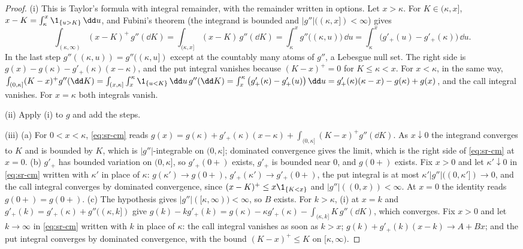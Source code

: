 \begin{proof}
(i) This is Taylor's formula with integral remainder, with the remainder written in options. Let
$x>\kappa$. For $K\in(\kappa,x]$, $x-K=\int_\kappa^x\1_{\{u>K\}}\,\dd u$, and Fubini's theorem (the
integrand is bounded and $|g''|((\kappa,x])<\infty$) gives
\[
  \int_{(\kappa,\infty)}(x-K)^+\,g''(\dd K)=\int_{(\kappa,x]}(x-K)\,g''(\dd K)
  =\int_\kappa^xg''\big((\kappa,u)\big)\,\dd u=\int_\kappa^x\big(g'_+(u)-g'_+(\kappa)\big)\,\dd u .
\]
In the last step $g''((\kappa,u))=g''((\kappa,u])$ except at the countably many atoms of $g''$, a Lebesgue
null set. The right side is $g(x)-g(\kappa)-g'_+(\kappa)(x-\kappa)$, and the put integral vanishes
because $(K-x)^+=0$ for $K\le\kappa<x$. For $x<\kappa$, in the same way,
$\int_{(0,\kappa]}(K-x)^+g''(\dd K)=\int_{(x,\kappa]}\int_x^\kappa\1_{\{u<K\}}\,\dd u\,g''(\dd K)
=\int_x^\kappa\big(g'_+(\kappa)-g'_+(u)\big)\,\dd u=g'_+(\kappa)(\kappa-x)-g(\kappa)+g(x)$, and the call integral
vanishes. For $x=\kappa$ both integrals vanish.

(ii) Apply (i) to $g$ and add the steps.

(iii) (a) For $0<x<\kappa$, \eqref{eq:sr-cm} reads $g(x)=g(\kappa)+g'_+(\kappa)(x-\kappa)+\int_{(0,\kappa]}(K-x)^+g''(\dd K)$.
As $x\downarrow0$ the integrand converges to $K$ and is bounded by $K$, which is $|g''|$-integrable on
$(0,\kappa]$; dominated convergence gives the limit, which is the right side of \eqref{eq:sr-cm} at $x=0$.
(b) $g'_+$ has bounded variation on $(0,\kappa]$, so $g'_+(0+)$ exists, $g'_+$ is bounded near $0$, and
$g(0+)$ exists. Fix $x>0$ and let $\kappa'\downarrow0$ in \eqref{eq:sr-cm} written with $\kappa'$ in place of
$\kappa$: $g(\kappa')\to g(0+)$, $g'_+(\kappa')\to g'_+(0+)$, the put integral is at most
$\kappa'|g''|((0,\kappa'])\to0$, and the call integral converges by dominated convergence, since
$(x-K)^+\le x\1_{\{K<x\}}$ and $|g''|((0,x))<\infty$. At $x=0$ the identity reads $g(0+)=g(0+)$.
(c) The hypothesis gives $|g''|([\kappa,\infty))<\infty$, so $B$ exists. For $k>\kappa$, (i) at $x=k$ and
$g'_+(k)=g'_+(\kappa)+g''((\kappa,k])$ give $g(k)-kg'_+(k)=g(\kappa)-\kappa g'_+(\kappa)-\int_{(\kappa,k]}K\,g''(\dd K)$,
which converges. Fix $x>0$ and let
$k\to\infty$ in \eqref{eq:sr-cm} written with $k$ in place of $\kappa$: the call integral vanishes as soon as
$k>x$; $g(k)+g'_+(k)(x-k)\to A+Bx$; and the put integral converges by dominated convergence, with the bound
$(K-x)^+\le K$ on $[\kappa,\infty)$.


\end{proof}
